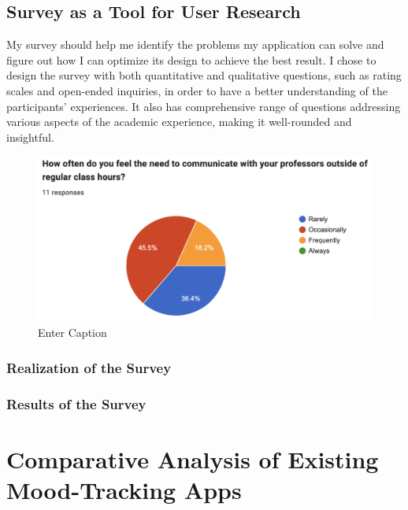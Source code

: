 \documentclass[11pt]{report}
\begin{document}
\subsection{Survey as a Tool for User Research}

My survey should help me identify the problems my application can solve and figure out how I can optimize its design to achieve the best result. I chose to design the survey with both quantitative and qualitative questions, such as rating scales and open-ended inquiries, in order to have a better understanding of the participants' experiences. It also has comprehensive range of questions addressing various aspects of the academic experience, making it well-rounded and insightful.

\begin{figure}[h!]
    \centering
    \includegraphics[width=0.9\linewidth]{figures/q11.png}
    \caption{Enter Caption}
    \label{fig:comments form}
\end{figure}

\subsubsection{Realization of the Survey}

\subsubsection{Results of the Survey}

\section{Comparative Analysis of Existing Mood-Tracking Apps}
\end{document}
